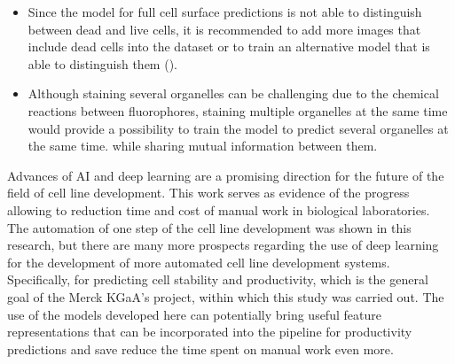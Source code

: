 \begin{itemize}
    \item Since the model for full cell surface predictions is not able to distinguish between dead and live cells, it is recommended to add more images that include dead cells into the dataset or to train an alternative model that is able to distinguish them (\cite{Ounkomol_2018}).
    \item Although staining several organelles can be challenging due to the chemical reactions between fluorophores, staining multiple organelles at the same time would provide a possibility to train the model to predict several organelles at the same time.  while sharing mutual information between them.
\end{itemize}
 
Advances of AI and deep learning are a promising direction for the future of the field of cell line development. This work serves as evidence of the progress allowing to reduction time and cost of manual work in biological laboratories. The automation of one step of the cell line development was shown in this research, but there are many more prospects regarding the use of deep learning for the development of more automated cell line development systems. Specifically, for predicting cell stability and productivity, which is the general goal of the Merck KGaA's project, within which this study was carried out. The use of the models developed here can potentially bring useful feature representations that can be incorporated into the pipeline for productivity predictions and save reduce the time spent on manual work even more.
